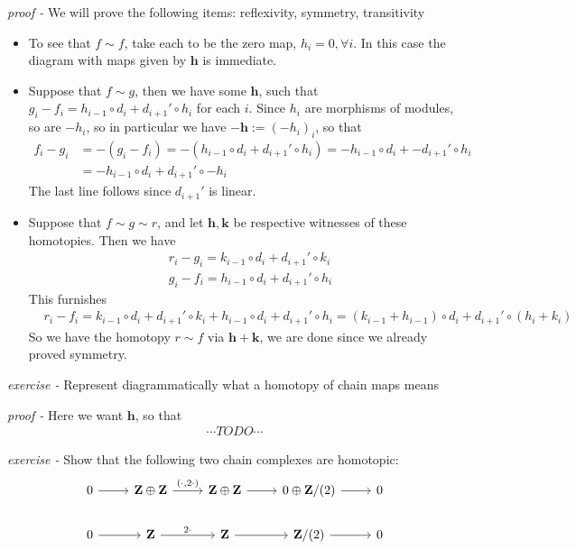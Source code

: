 \documentclass[11pt]{article}
\theoremstyle{definition}
\begin{document}
    \emph{proof - } We will prove the following items: reflexivity, symmetry, transitivity
    \begin{itemize}
        \item To see that \(f \sim f\), take each to be the zero map, \(h_i = 0, \forall i\). In this case the diagram with maps given by \(\mathbf{h}\) is immediate.
        \item Suppose that \(f \sim g\), then we have some \(\mathbf{h}\), such that \(g_i -f_i = h_{i-1}\circ d_i + d_{i+1}' \circ h_i\) for each \(i\). Since \(h_i\) are morphisms of modules, so are \(-h_i\), so in particular we have \(\mathbf{-h} := (-h_i)_i\), so that 
        \begin{align*}
            f_i - g_i &= -(g_i - f_i) = -(h_{i-1}\circ d_i + d_{i+1}' \circ h_i) = -h_{i-1}\circ d_i + -d_{i+1}' \circ h_i \\
            &= -h_{i-1}\circ d_i + d_{i+1}' \circ -h_i
        \end{align*}
        The last line follows since \(d_{i+1}'\) is linear.
        \item Suppose that \(f \sim g \sim r\), and let \(\mathbf{h, k}\) be respective witnesses of these homotopies. Then we have
        \begin{align*}
                &r_i - g_i = k_{i-1}\circ d_i + d_{i+1}'\circ k_i \\
                &g_i - f_i = h_{i-1}\circ d_i + d_{i+1}'\circ h_i
        \end{align*}
        This furnishes
        \begin{align*}
            &r_i - f_i = k_{i-1}\circ d_i + d_{i+1}'\circ k_i + h_{i-1}\circ d_i + d_{i+1}'\circ h_i
                       = (k_{i-1} + h_{i-1})\circ d_i + d_{i+1}'\circ(h_i + k_i)
        \end{align*}
        So we have the homotopy \(r \sim f\) via \(\mathbf{h} + \mathbf{k}\), we are done since we already proved symmetry.
    \end{itemize}

    \emph{exercise - } Represent diagrammatically what a homotopy of chain maps means

    \emph{proof - } Here we want \(\mathbf{h}\), so that
    \begin{align*}
        \cdots TODO \cdots
    \end{align*}

    \emph{exercise - } Show that the following two chain complexes are homotopic:
    \begin{equation*}
        \begin{tikzcd}
            0 \arrow[r] & \mathbf{Z} \oplus \mathbf{Z} \arrow[r,"{(\cdot , 2\cdot)}"] & \mathbf{Z} \oplus \mathbf{Z} \arrow[r] & 0 \oplus \mathbf{Z}/(2) \arrow[r] & 0 \\
            0 \arrow[r] & \mathbf{Z} \arrow[r,"2\cdot"] & \mathbf{Z} \arrow[r] & \mathbf{Z}/(2) \arrow[r] & 0
        \end{tikzcd}
    \end{equation*}
    
\end{document}
